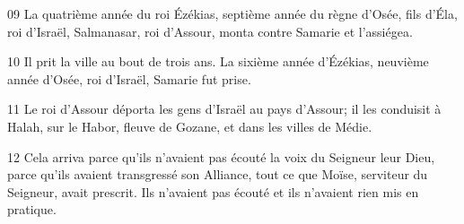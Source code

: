 
09 La quatrième année du roi Ézékias, septième année du règne d’Osée, fils d’Éla, roi d’Israël, Salmanasar, roi d’Assour, monta contre Samarie et l’assiégea.

10 Il prit la ville au bout de trois ans. La sixième année d’Ézékias, neuvième année d’Osée, roi d’Israël, Samarie fut prise.

11 Le roi d’Assour déporta les gens d’Israël au pays d’Assour; il les conduisit à Halah, sur le Habor, fleuve de Gozane, et dans les villes de Médie.

12 Cela arriva parce qu’ils n’avaient pas écouté la voix du Seigneur leur Dieu, parce qu’ils avaient transgressé son Alliance, tout ce que Moïse, serviteur du Seigneur, avait prescrit. Ils n’avaient pas écouté et ils n’avaient rien mis en pratique.